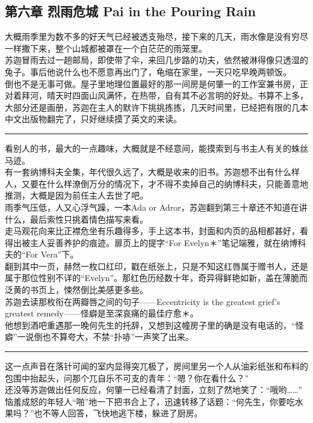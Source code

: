 \documentclass[oneside,11pt]{memoir} %
\begin{document}
\begin{CJK}{UTF8}{gbsn}
\chapter*{第六章    烈雨危城    Pai in the Pouring Rain}
大概雨季里为数不多的好天气已经被透支殆尽，接下来的几天，雨水像是没有穷尽一样撒下来，整个山城都被罩在一个白茫茫的雨笼里。\\\indent
    苏迦冒雨去过一趟邮局，即使带了伞，来回几步路的功夫，依然被淋得像只透湿的兔子。事后他说什么也不愿意再出门了，龟缩在家里，一天只吃早晚两顿饭。\\\indent
    倒也不是无事可做。屋子里地理位置最好的那一间房是何肇一的工作室兼书房，正对着拜河，晴天时四面山风满怀，在热带，自有其不必言明的好处。书算不上多，大部分还是画册，苏迦在主人的默许下挑挑拣拣，几天时间里，已经把有限的几本中文出版物翻完了，只好继续摸了英文的来读。\\\indent
\rule{-3pt}{30pt}
    看别人的书，最大的一点趣味，大概就是不经意间，能摸索到与书主人有关的蛛丝马迹。\\\indent
    有一套纳博科夫全集，年代很久远了，大概是收来的旧书。苏迦想不出有什么样人，又要在什么样潦倒万分的情况下，才不得不卖掉自己的纳博科夫，只能善意地推测，大概是因为前任主人去世了吧。\\\indent
    雨季气压低，人又心浮气躁，一本Ada or Adror，苏迦翻到第三十章还不知道在讲什么，最后索性只挑着情色描写来看。\\\indent
    走马观花向来比正襟危坐有乐趣得多，手上这本书，封面和内页的品相都甚好，看得出被主人妥善养护的痕迹。扉页上的提字“For Evelyn＊”笔记端雅，就在纳博科夫的“For Vera”下。\\\indent
    翻到其中一页，赫然一枚口红印，戳在纸张上，只是不知这红唇属于赠书人，还是属于那位性别不详的“Evelyn”。那红色历经数十年，奇异得鲜艳如新，盖在薄脆而泛黄的书页上，悚然倒比美感更多些。\\\indent
    苏迦去读那枚衔在两瓣唇之间的句子——Eccentricity is the greatest grief’s greatest remedy——怪癖是至深哀痛的最佳疗愈＊。\\\indent
    他想到酒吧重遇那一晚何先生的托辞，又想到这幢房子里的确是没有电话的，“怪癖”一说倒也不算夸大，不禁“扑哧”一声笑了出来。\\\indent
\rule{-3pt}{30pt}
    这一点声音在落针可闻的室内显得突兀极了，房间里另一个人从油彩纸张和布料的包围中抬起头，问那个兀自乐不可支的青年：“嗯？你在看什么？”\\\indent
    还没等苏迦做出任何反应，何肇一已经看清了封面，立刻了然地笑了：“哦哟……”\\\indent
    恼羞成怒的年轻人“啪”地一下把书合上了，迅速转移了话题：“何先生，你要吃水果吗？”也不等人回答，飞快地逃下楼，躲进了厨房。\\\indent

\end{CJK}
\end{document}
